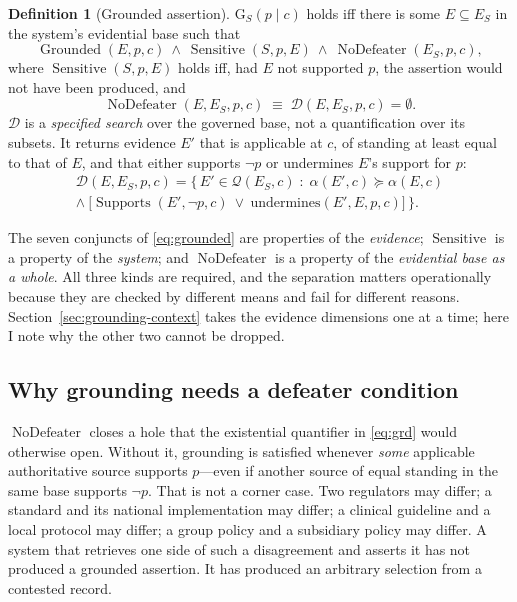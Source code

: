 \documentclass[11pt]{article}
\newcommand{\Grd}{\mathrm{G}}          %
\newcommand{\Supports}{\operatorname{Supports}}
\newcommand{\Grounded}{\operatorname{Grounded}}
\newcommand{\Sensitive}{\operatorname{Sensitive}}
\newcommand{\NoDefeater}{\operatorname{NoDefeater}}
\newcommand{\standing}{\alpha}
\newcommand{\DefeaterSearch}{\mathcal{D}}
\theoremstyle{plain}
\theoremstyle{definition}
\newtheorem{definition}{Definition}
\begin{document}
\begin{definition}[Grounded assertion]
\label{def:grounding}
$\Grd_S(p \mid c)$ holds iff there is some $E \subseteq E_S$ in the system's
evidential base such that
\begin{equation}
  \Grounded(E, p, c) \ \wedge\ \Sensitive(S, p, E) \ \wedge\ \NoDefeater(E_S, p, c),
  \label{eq:grd}
\end{equation}
where $\Sensitive(S, p, E)$ holds iff, had $E$ not supported $p$, the assertion would
not have been produced, and
\begin{equation}
  \NoDefeater(E, E_S, p, c) \;\equiv\; \DefeaterSearch(E, E_S, p, c) = \emptyset .
  \label{eq:nodefeater}
\end{equation}
$\DefeaterSearch$ is a \emph{specified search} over the governed base, not a
quantification over its subsets. It returns evidence $E'$ that is applicable at $c$, of
standing at least equal to that of $E$, and that either supports $\neg p$ or undermines
$E$'s support for $p$:
\begin{multline}
  \DefeaterSearch(E, E_S, p, c) = \bigl\{\, E' \in \mathcal{Q}(E_S, c) \;:\;
    \standing(E', c) \succeq \standing(E, c)\\
    \wedge\ \bigl[\Supports(E', \neg p, c)
      \ \vee\ \text{undermines}(E', E, p, c)\bigr] \,\bigr\}.
  \label{eq:defeatersearch}
\end{multline}
\end{definition}

The seven conjuncts of \eqref{eq:grounded} are properties of the \emph{evidence};
$\Sensitive$ is a property of the \emph{system}; and $\NoDefeater$ is a property of
the \emph{evidential base as a whole}. All three kinds are required, and the
separation matters operationally because they are checked by different means and fail
for different reasons. Section~\ref{sec:grounding-context} takes the evidence
dimensions one at a time; here I note why the other two cannot be dropped.

\subsection{Why grounding needs a defeater condition}
\label{sec:why-defeater}

$\NoDefeater$ closes a hole that the existential quantifier in \eqref{eq:grd} would
otherwise open. Without it, grounding is satisfied whenever \emph{some} applicable
authoritative source supports $p$---even if another source of equal standing in the same
base supports $\neg p$. That is not a corner case. Two regulators may differ; a standard
and its national implementation may differ; a clinical guideline and a local protocol
may differ; a group policy and a subsidiary policy may differ. A system that retrieves
one side of such a disagreement and asserts it has not produced a grounded assertion. It
has produced an arbitrary selection from a contested record.
\end{document}
